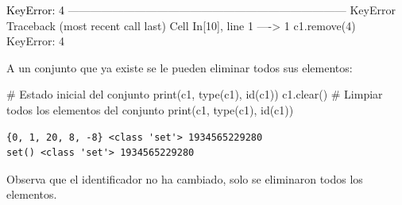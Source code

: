 \documentclass[
  spanish,
  letterpaper,
]{scrbook}
\newenvironment{Shaded}{\begin{snugshade}}{\end{snugshade}}
\newcommand{\BuiltInTok}[1]{\textcolor[rgb]{0.00,0.23,0.31}{#1}}
\newcommand{\CommentTok}[1]{\textcolor[rgb]{0.37,0.37,0.37}{#1}}
\newcommand{\NormalTok}[1]{\textcolor[rgb]{0.00,0.23,0.31}{#1}}
\theoremstyle{definition}
\theoremstyle{remark}
\begin{document}
\begin{Highlighting}
\textcolor{black}{KeyError: 4}
\textcolor{black}{}\textcolor{QuartoInternalColor1}{---------------------------------------------------------------------------}\textcolor{QuartoInternalColor2}{}
\textcolor{QuartoInternalColor2}{}\textcolor{QuartoInternalColor1}{KeyError}\textcolor{QuartoInternalColor2}{                                  Traceback (most recent call last)}
\textcolor{QuartoInternalColor2}{}\textcolor{QuartoInternalColor3}{Cell}\textcolor{QuartoInternalColor2}{}\textcolor{QuartoInternalColor3}{ }\textcolor{QuartoInternalColor2}{}\textcolor{QuartoInternalColor4}{In[10]}\textcolor{QuartoInternalColor2}{}\textcolor{QuartoInternalColor4}{, line 1}\textcolor{QuartoInternalColor2}{}
\textcolor{QuartoInternalColor2}{}\textcolor{QuartoInternalColor4}{----> }\textcolor{QuartoInternalColor2}{}\textcolor{QuartoInternalColor4}{1}\textcolor{QuartoInternalColor2}{ }\textcolor{QuartoInternalColor2}{c1}\textcolor{QuartoInternalColor2}{}\textcolor{QuartoInternalColor2}{.}\textcolor{QuartoInternalColor2}{}\textcolor{QuartoInternalColor2}{remove}\textcolor{QuartoInternalColor2}{}\textcolor{QuartoInternalColor2}{(}\textcolor{QuartoInternalColor2}{}\textcolor{QuartoInternalColor2}{4}\textcolor{QuartoInternalColor2}{}\textcolor{QuartoInternalColor2}{)}\textcolor{QuartoInternalColor2}{}
\textcolor{QuartoInternalColor2}{}\textcolor{QuartoInternalColor1}{KeyError}\textcolor{QuartoInternalColor2}{: 4}
\end{Highlighting}

A un conjunto que ya existe se le pueden eliminar todos sus elementos:

\begin{Shaded}
\begin{Highlighting}[]
\CommentTok{\# Estado inicial del conjunto}
\BuiltInTok{print}\NormalTok{(c1, }\BuiltInTok{type}\NormalTok{(c1), }\BuiltInTok{id}\NormalTok{(c1))}
\NormalTok{c1.clear() }\CommentTok{\# Limpiar todos los elementos del conjunto}
\BuiltInTok{print}\NormalTok{(c1, }\BuiltInTok{type}\NormalTok{(c1), }\BuiltInTok{id}\NormalTok{(c1))}
\end{Highlighting}
\end{Shaded}

\begin{verbatim}
{0, 1, 20, 8, -8} <class 'set'> 1934565229280
set() <class 'set'> 1934565229280
\end{verbatim}

Observa que el identificador no ha cambiado, solo se eliminaron todos
los elementos.
\end{document}
